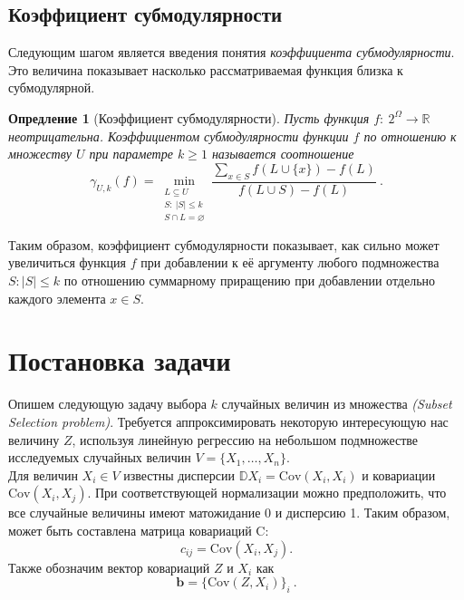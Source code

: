 \documentclass[preprint,12pt]{elsarticle}
\newtheorem{definition}{Опредление}
\newtheorem{theorem}{Теорема}
\begin{document}

\subsection{Коэффициент субмодулярности}

Следующим шагом является введения понятия \textit{коэффициента субмодулярности}. Это величина показывает насколько рассматриваемая функция близка к субмодулярной.  

\begin{definition}[Коэффициент субмодулярности]

Пусть функция $f:~2^\Omega \rightarrow \mathbb{R}$ неотрицательна. Коэффициентом субмодулярности функции $f$ по отношению к множеству $U$ при параметре $k \geqslant 1$ называется соотношение
\[\gamma_{U, k}(f)=\min\limits_{\substack{L\subseteq U \\ 
                                          S:~|S| \leqslant k \\ 
                                          S \cap L=\varnothing}} \frac{\sum\limits_{x \in S} f(L \cup\{x\})-f(L)}{f(L \cup S)-f(L)}~.\]
\end{definition}

Таким образом, коэффициент субмодулярности показывает, как сильно может увеличиться функция $f$ при добавлении к её аргументу любого подмножества $S: |S|\leqslant k$ по отношению суммарному приращению при добавлении отдельно каждого элемента $x \in S$.

\section{Постановка задачи}

\label{S:2}
Опишем следующую задачу выбора $k$ случайных величин из множества \textit{(Subset Selection problem)}. Требуется аппроксимировать некоторую интересующую нас величину $Z$, используя линейную регрессию на небольшом подмножестве исследуемых случайных величин $V=\{X_1,\dots, X_n\}$.\\

Для величин $X_i \in V$ известны дисперсии $\mathbb{D}X_i = \mathrm{Cov}(X_i, X_i)$ и ковариации $\mathrm{Cov}(X_i, X_j)$. 
При соответствующей нормализации можно предположить, что все случайные величины имеют матожидание 0 и дисперсию 1. 
Таким образом, может быть составлена матрица ковариаций C:
\[c_{ij} = \mathrm{Cov}(X_i, X_j).\] 
Также обозначим вектор ковариаций $Z$ и $X_i$ как 
\[\textbf{b}= \{\mathrm{Cov}(Z, X_i)\}_i~.\] 
\end{document}
